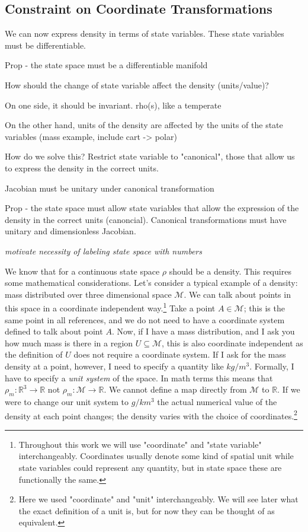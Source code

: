 \documentclass{article}
\begin{document}
\subsection{Constraint on Coordinate Transformations}	

We can now express density in terms of state variables. These state variables must be differentiable.

Prop - the state space must be a differentiable manifold

How should the change of state variable affect the density (units/value)?

On one side, it should be invariant. rho(s), like a temperate

On the other hand, units of the density are affected by the units of the state variables (mass example, include cart -> polar)

How do we solve this? Restrict state variable to "canonical", those that allow us to express the density in the correct units.

Jacobian must be unitary under canonical transformation

Prop - the state space must allow state variables that allow the expression of the density in the correct units (canoncial). Canonical transformations must have unitary and dimensionless Jacobian.


	\emph{motivate necessity of labeling state space with numbers}	
	
	We know that for a continuous state space $\rho$ should be a density. This requires some mathematical considerations. Let's consider a typical example of a density: mass distributed over three dimensional space $\mathcal{M}$. We can talk about points in this space in a coordinate independent way.\footnote{Throughout this work we will use "coordinate" and "state variable" interchangeably. Coordinates usually denote some kind of spatial unit while state variables could represent any quantity, but in state space these are functionally the same.} Take a point $A \in \mathcal{M}$; this is the same point in all references, and we do not need to have a coordinate system defined to talk about point $A$. Now, if I have a mass distribution, and I ask you how much mass is there in a region $U \subseteq \mathcal{M}$, this is also coordinate independent as the definition of $U$ does not require a coordinate system. If I ask for the mass density at a point, however, I need to specify a quantity like $kg/m^3$. Formally, I have to specify a \textit{unit system} of the space. In math terms this means that $\rho_m : \mathbb{R}^3 \to \mathbb{R}$ not $\rho_m : \mathcal{M} \to \mathbb{R}$. We cannot define a map directly from $\mathcal{M}$ to $\mathbb{R}$. If we were to change our unit system to $g/km^3$ the actual numerical value of the density at each point changes; the density varies with the choice of coordinates.\footnote{Here we used "coordinate" and "unit" interchangeably. We will see later what the exact definition of a unit is, but for now they can be thought of as equivalent.}
	
\end{document}
